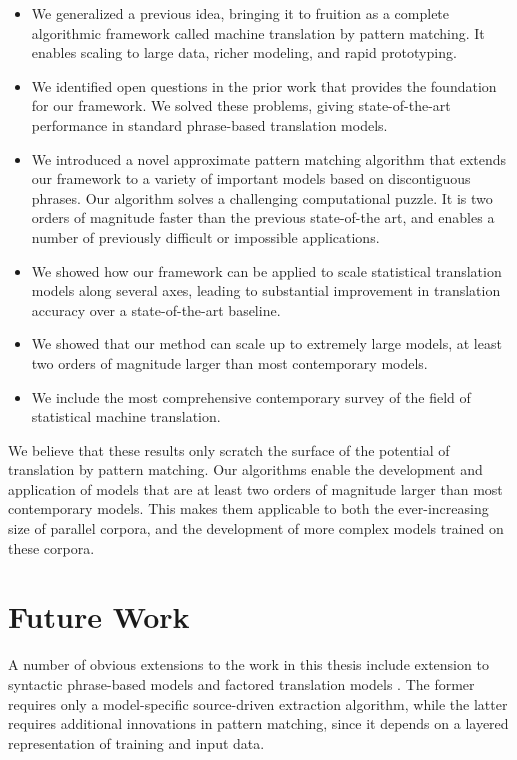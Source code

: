 \begin{itemize}

	\item We generalized a previous idea, bringing it to fruition as
	a complete algorithmic framework called machine translation 
	by pattern matching.  It enables scaling to large data, richer modeling,
	and rapid prototyping.

	\item We identified open questions in the prior work that provides the foundation
	for our framework.  We solved these problems, giving
	state-of-the-art performance in standard phrase-based translation models.

	\item We introduced a novel approximate pattern matching algorithm that
	extends our framework to a variety of important models based on 
	discontiguous phrases.  Our algorithm solves a challenging computational puzzle.  
	It is two orders of magnitude faster than the previous state-of-the art, and 
	enables a number of previously difficult or impossible applications.

	\item We showed how our framework can be applied to scale statistical translation
	models along several axes, leading to substantial improvement in translation accuracy over
	a state-of-the-art baseline.
	
	\item We showed that our method can scale up to extremely large models, at least
	two orders of magnitude larger than most contemporary models.
	
	\item We include the most comprehensive contemporary survey of the field of statistical
	machine translation.
\end{itemize}

\noindent We believe that these results only scratch the surface of
the potential of translation by pattern matching.  
Our algorithms enable the development and application of 
models that are at least two orders of magnitude larger than
most contemporary models.  This makes them applicable to both
the ever-increasing size of parallel corpora, and the
development of more complex models trained on these
corpora.

\section{Future Work}

A number of obvious extensions to the 
work in this thesis include extension to syntactic phrase-based models
\citep{Galley:2004:naacl,Galley:2006:acl,DeNeefe:2007:emnlp-conll}
and factored translation models \citep{Koehn:2007:acl-demo,Koehn:2007:emnlp}.
The former requires only a model-specific source-driven extraction 
algorithm, while the latter requires additional innovations in pattern
matching, since it depends on a layered representation of training 
and input data.

